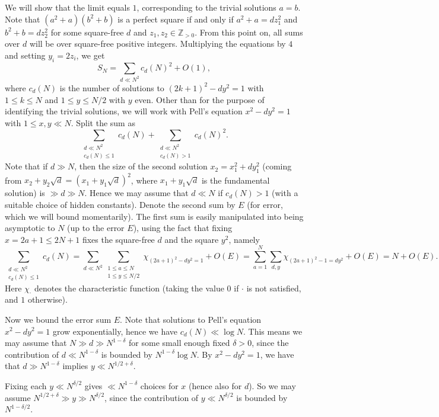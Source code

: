 \documentclass{article}
\begin{document}
We will show that the limit equals $1$, corresponding to the trivial solutions $a = b$. Note that $(a^2 + a)(b^2 + b)$ is a perfect square if and only if $a^2 + a = d z_1^2$ and $b^2 + b = d z_2^2$ for some square-free $d$ and $z_1, z_2 \in \mathbb{Z}_{>0}$. From this point on, all sums over $d$ will be over square-free positive integers. Multiplying the equations by $4$ and setting $y_i = 2 z_i$, we get
\[
S_N = \sum_{d \ll N^2} c_d(N)^2 + O(1),
\]
where $c_d(N)$ is the number of solutions to $(2k+1)^2 - d y^2 = 1$ with $1 \leq k \leq N$ and $1 \leq y \leq N/2$ with $y$ even. Other than for the purpose of identifying the trivial solutions, we will work with Pell's equation $x^2 - d y^2 = 1$ with $1 \leq x, y \ll N$. Split the sum as
\[
\sum_{\substack{d \ll N^2 \\ c_d(N) \leq 1}} c_d(N) + \sum_{\substack{d \ll N^2 \\ c_d(N) > 1}} c_d(N)^2.
\]
Note that if $d \gg N$, then the size of the second solution $x_2 = x_1^2 + d y_1^2$ (coming from $x_2 + y_2 \sqrt{d} = (x_1 + y_1 \sqrt{d})^2$, where $x_1 + y_1 \sqrt{d}$ is the fundamental solution) is $\gg d \gg N$. Hence we may assume that $d \ll N$ if $c_d(N) > 1$ (with a suitable choice of hidden constants). Denote the second sum by $E$ (for error, which we will bound momentarily). The first sum is easily manipulated into being asymptotic to $N$ (up to the error $E$), using the fact that fixing $x = 2a + 1 \leq 2N + 1$ fixes the square-free $d$ and the square $y^2$, namely
\[
\sum_{\substack{d \ll N^2 \\ c_d(N) \leq 1}} c_d(N) = \sum_{d \ll N^2} \sum_{\substack{1 \leq a \leq N \\ 1 \leq y \leq N/2}} \chi_{(2a+1)^2 - d y^2 = 1} + O(E) = \sum_{a=1}^N \sum_{d, y} \chi_{(2a+1)^2 - 1 = d y^2} + O(E) = N + O(E).
\]
Here $\chi_\cdot$ denotes the characteristic function (taking the value $0$ if $\cdot$ is not satisfied, and $1$ otherwise).

Now we bound the error sum $E$. Note that solutions to Pell's equation $x^2 - d y^2 = 1$ grow exponentially, hence we have $c_d(N) \ll \log N$. This means we may assume that $N \gg d \gg N^{1-\delta}$ for some small enough fixed $\delta > 0$, since the contribution of $d \ll N^{1-\delta}$ is bounded by $N^{1-\delta} \log N$. By $x^2 - d y^2 = 1$, we have that $d \gg N^{1-\delta}$ implies $y \ll N^{1/2+\delta}$.

Fixing each $y \ll N^{\delta/2}$ gives $\ll N^{1-\delta}$ choices for $x$ (hence also for $d$). So we may assume $N^{1/2+\delta} \gg y \gg N^{\delta/2}$, since the contribution of $y \ll N^{\delta/2}$ is bounded by $N^{1-\delta/2}$.
\end{document}
